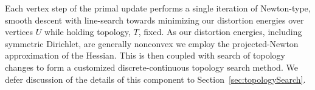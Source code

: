 
Each vertex step of the primal update performs a single iteration of Newton-type, smooth descent with line-search towards minimizing our distortion energies over vertices $U$ while holding topology, $T$, fixed. As our distortion energies, including symmetric Dirichlet, are generally nonconvex we employ the projected-Newton\ \cite{Teran2005Robust} approximation of the Hessian. This is then coupled with 
search of topology changes to form a customized discrete-continuous topology search method. We defer discussion of the details of this component to Section~\ref{sec:topologySearch}.
%

%


